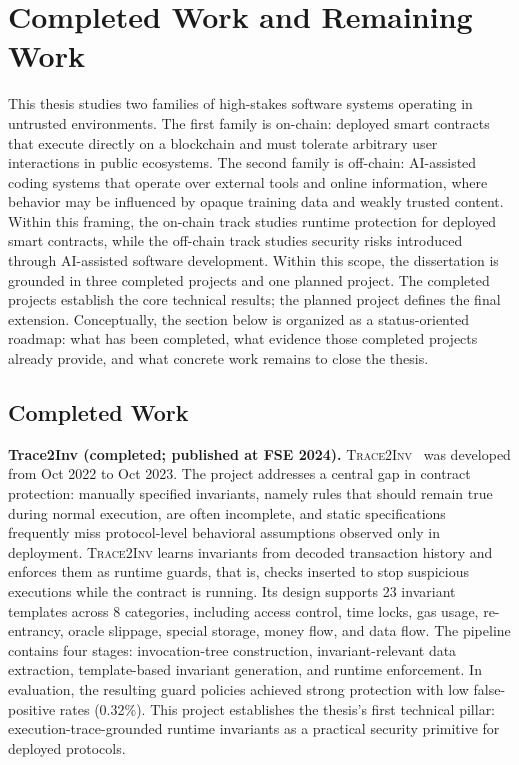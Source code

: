 \section{Completed Work and Remaining Work}

This thesis studies two families of high-stakes software systems operating in untrusted environments.
The first family is on-chain: deployed smart contracts that execute directly on a blockchain and must tolerate arbitrary user interactions in public ecosystems.
The second family is off-chain: AI-assisted coding systems that operate over external tools and online information, where behavior may be influenced by opaque training data and weakly trusted content.
Within this framing, the on-chain track studies runtime protection for deployed smart contracts,
while the off-chain track studies security risks introduced through AI-assisted software development.
Within this scope, the dissertation is grounded in three completed projects and one planned project.
The completed projects establish the core technical results; the planned project defines the final extension.
Conceptually, the section below is organized as a status-oriented roadmap: what has been completed,
what evidence those completed projects already provide, and what concrete work remains to close the thesis.

\subsection{Completed Work}

\noindent \textbf{Trace2Inv (completed; published at FSE 2024).}
\textsc{Trace2Inv}~\cite{chen2024demystifying} was developed from Oct 2022 to Oct 2023.
The project addresses a central gap in contract protection: manually specified invariants, namely rules that should remain true during normal execution, are often incomplete,
and static specifications frequently miss protocol-level behavioral assumptions observed only in deployment.
\textsc{Trace2Inv} learns invariants from decoded transaction history and enforces them as runtime guards, that is, checks inserted to stop suspicious executions while the contract is running.
Its design supports 23 invariant templates across 8 categories, including access control, time locks,
gas usage, re-entrancy, oracle slippage, special storage, money flow, and data flow.
The pipeline contains four stages: invocation-tree construction, invariant-relevant data extraction,
template-based invariant generation, and runtime enforcement.
In evaluation, the resulting guard policies achieved strong protection with low false-positive rates (0.32\%).
This project establishes the thesis's first technical pillar: execution-trace-grounded runtime invariants
as a practical security primitive for deployed protocols.

